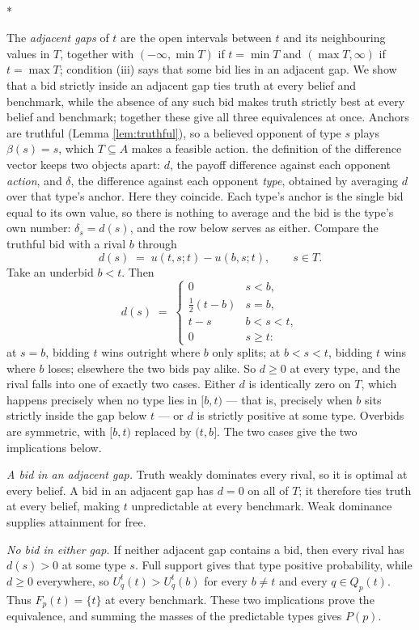 \documentclass[12pt]{article}
\makeatletter
\theoremstyle{definition}
\renewenvironment{proof}[1][\proofname]{\par
  \pushQED{\qed}%
  \normalfont \topsep6\p@\@plus6\p@\relax
  \trivlist
  \item[\hskip\labelsep\itshape #1\@addpunct{.}]\mbox{}\\*
  \ignorespaces
}{%
  \popQED\endtrivlist\@endpefalse
}
\makeatother
\begin{document}
\begin{proof}[Proof of Corollary \ref{th:gaps}]
The \emph{adjacent gaps} of $t$ are the open intervals between $t$ and its neighbouring values in $T$, together with $(-\infty, \min T)$ if $t = \min T$ and $(\max T, \infty)$ if $t = \max T$; condition (iii) says that some bid lies in an adjacent gap.
We show that a bid strictly inside an adjacent gap ties truth at every belief and benchmark, while the absence of any such bid makes truth strictly best at every belief and benchmark; together these give all three equivalences at once. Anchors are truthful (Lemma \ref{lem:truthful}), so a believed opponent of type $s$ plays $\beta(s) = s$, which $T \subseteq A$ makes a feasible action. the definition of the difference vector keeps two objects apart: $d$, the payoff difference against each opponent \emph{action}, and $\delta$, the difference against each opponent \emph{type}, obtained by averaging $d$ over that type's anchor. Here they coincide. Each type's anchor is the single bid equal to its own value, so there is nothing to average and the bid is the type's own number: $\delta_s = d(s)$, and the row below serves as either. Compare the truthful bid with a rival $b$ through
\[
d(s) \;=\; u(t, s; t) - u(b, s; t), \qquad s \in T.
\]
Take an underbid $b < t$. Then
\[
d(s) \;=\;
\begin{cases}
0 & s < b, \\
\tfrac12 (t - b) & s = b, \\
t - s & b < s < t, \\
0 & s \ge t :
\end{cases}
\]
at $s = b$, bidding $t$ wins outright where $b$ only splits; at $b < s < t$, bidding $t$ wins where $b$ loses; elsewhere the two bids pay alike. So $d \ge 0$ at every type, and the rival falls into one of exactly two cases. Either $d$ is identically zero on $T$, which happens precisely when no type lies in $[b, t)$ --- that is, precisely when $b$ sits strictly inside the gap below $t$ --- or $d$ is strictly positive at some type. Overbids are symmetric, with $[b, t)$ replaced by $(t, b]$. The two cases give the two implications below.

\emph{A bid in an adjacent gap.} Truth weakly dominates every rival, so it is optimal at every belief. A bid in an adjacent gap has $d = 0$ on all of $T$; it therefore ties truth at every belief, making $t$ unpredictable at every benchmark. Weak dominance supplies attainment for free.

\emph{No bid in either gap.} If neither adjacent gap contains a bid, then every rival has $d(s) > 0$ at some type $s$. Full support gives that type positive probability, while $d \ge 0$ everywhere, so $U^t_q(t) > U^t_q(b)$ for every $b \neq t$ and every $q \in Q_p(t)$. Thus $F_p(t) = \{t\}$ at every benchmark. These two implications prove the equivalence, and summing the masses of the predictable types gives $P(p)$.


\end{proof}
\end{document}
